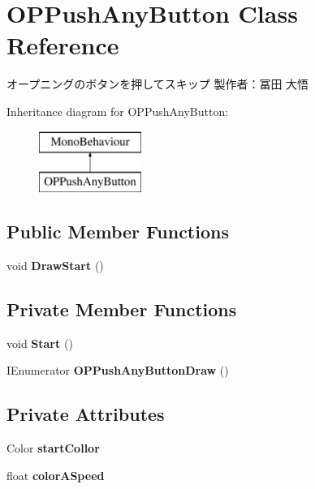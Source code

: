 \hypertarget{class_o_p_push_any_button}{}\section{O\+P\+Push\+Any\+Button Class Reference}
\label{class_o_p_push_any_button}


オープニングのボタンを押してスキップ 製作者：冨田 大悟  


Inheritance diagram for O\+P\+Push\+Any\+Button\+:\begin{figure}[H]
\begin{center}
\leavevmode
\includegraphics[height=2.000000cm]{class_o_p_push_any_button}
\end{center}
\end{figure}
\subsection*{Public Member Functions}
\begin{DoxyCompactItemize}
\item 
\mbox{\label{class_o_p_push_any_button_a55d7abc57e18cec92324309c795d3152}} 
void {\bfseries Draw\+Start} ()
\end{DoxyCompactItemize}
\subsection*{Private Member Functions}
\begin{DoxyCompactItemize}
\item 
\mbox{\label{class_o_p_push_any_button_ad16ef251681977248b2e403fd2fd3ae9}} 
void {\bfseries Start} ()
\item 
\mbox{\label{class_o_p_push_any_button_af950699a7b3fe097ae57d8382376c964}} 
I\+Enumerator {\bfseries O\+P\+Push\+Any\+Button\+Draw} ()
\end{DoxyCompactItemize}
\subsection*{Private Attributes}
\begin{DoxyCompactItemize}
\item 
\mbox{\label{class_o_p_push_any_button_a1a054c0dfb6b9484e8b3d11d5160ffaa}} 
Color {\bfseries start\+Collor}
\item 
\mbox{\label{class_o_p_push_any_button_ab12a583d551126c86526ef760ad0835f}} 
float {\bfseries color\+A\+Speed}
\end{DoxyCompactItemize}


